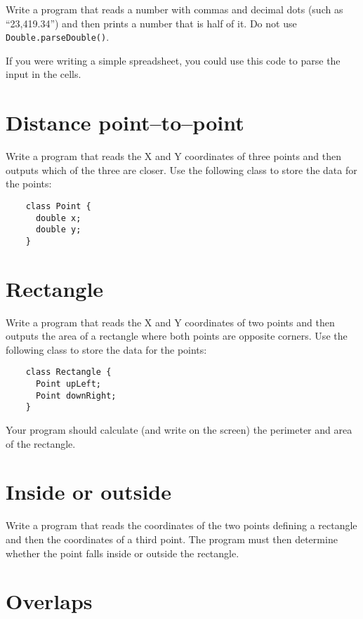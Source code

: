 \documentclass{article}
\begin{document}
Write a program that reads a number with commas and decimal dots (such
as ``23,419.34'') and then prints a number that is half of it. Do not
use \verb+Double.parseDouble()+. 

If you were writing a simple spreadsheet, you could use this code to
parse the input in the cells. 

\section{Distance point--to--point}
\label{sec:distance-point-point}

Write a program that reads the X and Y coordinates of three points and
then outputs which of the three are closer. Use the following class
to store the data for the points: 

\begin{verbatim}
    class Point {
      double x;
      double y;
    }
\end{verbatim}

\section{Rectangle}
\label{sec:rectangle}

Write a program that reads the X and Y coordinates of two points and
then outputs the area of a rectangle where both points are opposite
corners. Use the following class
to store the data for the points: 

\begin{verbatim}
    class Rectangle {
      Point upLeft;
      Point downRight;
    }
\end{verbatim}

Your program should calculate (and write on the screen) the perimeter
and area of the rectangle. 

\section{Inside or outside}
\label{sec:inside-or-outside}

Write a program that reads the coordinates of the two points defining a
rectangle and then the coordinates of a third point. The program must
then determine whether the point falls inside or outside the
rectangle. 

\section{Overlaps}
\label{sec:insideinside}
\end{document}
